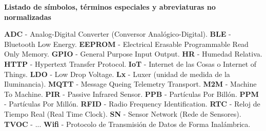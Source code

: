 \renewcommand{\thepage}{\Roman{page}}
    \textbf{\Large Listado de símbolos, términos especiales y abreviaturas no normalizadas}\newline

    \textbf{ADC} - Analog-Digital Converter (Conversor Analógico-Digital).
    \newline
    \textbf{BLE} - Bluetooth Low Energy.
    \newline
    \textbf{EEPROM} - Electrical Erasable Programmable Read Only Memory.
    \newline
    \textbf{GPIO} - General Purpose Input Output.
    \newline
    \textbf{HR} - Humedad Relativa.
    \newline
    \textbf{HTTP} - Hypertext Transfer Protocol.
    \newline
    \textbf{IoT} - Internet de las Cosas o Internet of Things.
    \newline
    \textbf{LDO} - Low Drop Voltage.
    \newline
    \textbf{Lx} - Luxer (unidad de medida de la Iluminancia).
    \newline
    \textbf{MQTT} - Message Queing Telemetry Transport.
    \newline
    \textbf{M2M} - Machine To Machine.
    \newline
    \textbf{PIR} - Passive Infrared Sensor.
    \newline
    \textbf{PPB} - Partículas Por Billón.
    \newline
    \textbf{PPM} - Partículas Por Millón.
    \newline
    \textbf{RFID} - Radio Frequency Identification.
    \newline
    \textbf{RTC} - Reloj de Tiempo Real (Real Time Clock).
    \newline
    \textbf{SN} - Sensor Network (Rede de Sensores).
    \newline
    \textbf{TVOC} - ...
    \newline
    \textbf{Wifi} - Protocolo de Transmisión de Datos de Forma Inalámbrica.
    
    \setcounter{page}{1}
    \thispagestyle{plain}